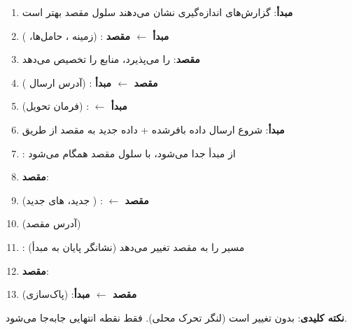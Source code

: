 \begin{enumerate}
\def\labelenumi{\arabic{enumi}.}
\tightlist
\item
  \textbf{ مبدأ}: گزارش‌های اندازه‌گیری نشان می‌دهند سلول مقصد بهتر است
\item
  \textbf{مبدأ \ensuremath{\leftarrow}  مقصد} :  (زمینه ، حامل‌ها، )
\item
  \textbf{ مقصد}:  را می‌پذیرد، منابع را تخصیص می‌دهد
\item
  \textbf{مقصد \ensuremath{\leftarrow}  مبدأ} :  (آدرس ارسال )
\item
  \textbf{ مبدأ \ensuremath{\leftarrow} }:  (فرمان تحویل)
\item
  \textbf{ مبدأ}: شروع ارسال داده بافر‌شده + داده  جدید به  مقصد از طریق 
\item
  : از مبدأ جدا می‌شود، با سلول مقصد همگام می‌شود
\item
  \textbf{ مقصد}: 
\item
  \textbf{ مقصد \ensuremath{\leftarrow} }:  ( جدید، های جدید)
\item
   (آدرس  مقصد)
\item
  : مسیر  را به  مقصد تغییر می‌دهد (نشانگر پایان به مبدأ)
\item
  \textbf{ مقصد}: 
\item
  \textbf{مقصد \ensuremath{\leftarrow}  مبدأ}:  (پاک‌سازی)
\end{enumerate}

\begin{CNinsight}

\textbf{نکته کلیدی}:  بدون تغییر است (لنگر تحرک محلی). فقط نقطه انتهایی  جابه‌جا می‌شود.

\end{CNinsight}

